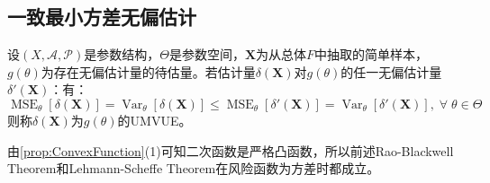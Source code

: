 \subsection{一致最小方差无偏估计}
\begin{definition}
	设$(X,\mathscr{A},\mathscr{P})$是参数结构，$\Theta$是参数空间，$\mathbf{X}$为从总体$F$中抽取的简单样本，$g(\theta)$为存在无偏估计量的待估量。若估计量$\delta(\mathbf{X})$对$g(\theta)$的任一无偏估计量$\delta'(\mathbf{X})$：有：
	\begin{equation*}
		\operatorname{MSE}_{\theta}[\delta(\mathbf{X})]=\operatorname{Var}_{\theta}[\delta(\mathbf{X})]\leqslant\operatorname{MSE}_{\theta}[\delta'(\mathbf{X})]=\operatorname{Var}_{\theta}[\delta'(\mathbf{X})],\;\forall\;\theta\in\Theta
	\end{equation*}
	则称$\delta(\mathbf{X})$为$g(\theta)$的\gls{UMVUE}。
\end{definition}
\begin{note}
	由\cref{prop:ConvexFunction}(1)可知二次函数是严格凸函数，所以前述Rao-Blackwell Theorem和Lehmann-Scheffe Theorem在风险函数为方差时都成立。
\end{note}

